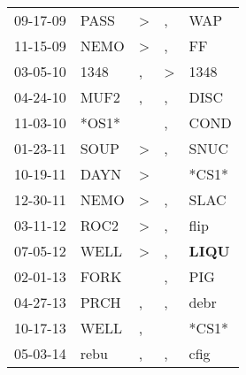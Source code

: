 \begin{supertabular}{p{0.07\textwidth}p{0.06\textwidth}p{0.02\textwidth}p{0.02\textwidth}p{0.06\textwidth}}
          09-17-09\textsuperscript{} &           PASS\textsuperscript{} &     \textgreater &                , &            WAP\textsuperscript{} \\
          11-15-09\textsuperscript{} &           NEMO\textsuperscript{} &     \textgreater &                , &             FF\textsuperscript{} \\
          03-05-10\textsuperscript{} &           1348\textsuperscript{} &                , &     \textgreater &           1348\textsuperscript{} \\
          04-24-10\textsuperscript{} &           MUF2\textsuperscript{} &                , &                , &           DISC\textsuperscript{} \\
          11-03-10\textsuperscript{} &                            *OS1* &                  &                , &           COND\textsuperscript{} \\
          01-23-11\textsuperscript{} &           SOUP\textsuperscript{} &     \textgreater &                , &           SNUC\textsuperscript{} \\
          10-19-11\textsuperscript{} &           DAYN\textsuperscript{} &     \textgreater &                  &                            *CS1* \\
          12-30-11\textsuperscript{} &           NEMO\textsuperscript{} &     \textgreater &                , &           SLAC\textsuperscript{} \\
          03-11-12\textsuperscript{} &           ROC2\textsuperscript{} &     \textgreater &                , &           flip\textsuperscript{} \\
          07-05-12\textsuperscript{} &           WELL\textsuperscript{} &     \textgreater &                , &  \textbf{LIQU\textsuperscript{}} \\
          02-01-13\textsuperscript{} &           FORK\textsuperscript{} &                  &                , &            PIG\textsuperscript{} \\
          04-27-13\textsuperscript{} &           PRCH\textsuperscript{} &                , &                , &           debr\textsuperscript{} \\
          10-17-13\textsuperscript{} &           WELL\textsuperscript{} &                , &                  &                            *CS1* \\
          05-03-14\textsuperscript{} &           rebu\textsuperscript{} &                , &                , &           cfig\textsuperscript{} \\

\end{supertabular}
